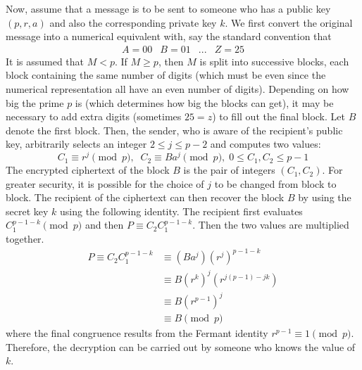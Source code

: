 \documentclass{article}
\theoremstyle{remark}
\theoremstyle{definition}
\begin{document}
Now, assume that a message is to be sent to someone who has a public key $(p, r, a)$ and also the corresponding private key $k$. We first convert the original message into a numerical equivalent with, say the standard convention that 
\[\begin{array}{cccc}
    A = 00 & B = 01 & ... & Z = 25
\end{array}\]
It is assumed that $M<p$. If $M \geq p$, then $M$ is split into successive blocks, each block containing the same number of digits (which must be even since the numerical representation all have an even number of digits). Depending on how big the prime $p$ is (which determines how big the blocks can get), it may be necessary to add extra digits (sometimes $25 = z$) to fill out the final block. Let $B$ denote the first block. Then, the sender, who is aware of the recipient's public key, arbitrarily selects an integer $2 \leq j \leq p-2$ and computes two values: 
\[C_1 \equiv r^j \pmod{p}, \;\; C_2 \equiv Ba^j \pmod{p}, \; 0 \leq C_1, C_2 \leq p-1\]
The encrypted ciphertext of the block $B$ is the pair of integers $(C_1, C_2)$. For greater security, it is possible for the choice of $j$ to be changed from block to block. The recipient of the ciphertext can then recover the block $B$ by using the secret key $k$ using the following identity. The recipient first evaluates $C_1^{p-1-k} \pmod{p}$ and then $P \equiv C_2 C_1^{p-1-k}$. Then the two values are multiplied together. 
\begin{align*}
    P \equiv C_2 C_1^{p-1-k} & \equiv (Ba^j)(r^j)^{p-1-k} \\
    & \equiv B (r^k)^j (r^{j(p-1) - jk}) \\
    & \equiv B(r^{p-1})^j \\
    & \equiv B \pmod{p}
\end{align*}
where the final congruence results from the Fermant identity $r^{p-1} \equiv 1 \pmod{p}$. Therefore, the decryption can be carried out by someone who knows the value of $k$. 
\end{document}
